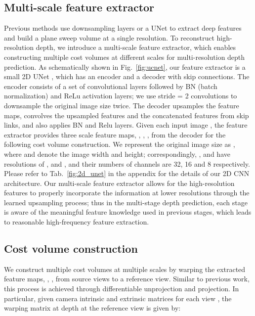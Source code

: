 \subsection{Multi-scale feature extractor}
\label{sec:feature}
Previous methods use downsampling layers \cite{yao2018mvsnet,yao2019recurrent} or a UNet \cite{xu2019deep} to extract deep features 
and build a plane sweep volume at a single resolution.
To reconstruct high-resolution depth, we introduce a multi-scale feature extractor, 
which enables constructing multiple cost volumes at different scales for multi-resolution depth prediction.
As schematically shown in Fig.~\ref{fig:ucnet}, 
our feature extractor is a small 2D UNet \cite{ronneberger2015u}, which has an encoder and a decoder with skip connections.
The encoder consists of a set of convolutional layers followed by BN (batch normalization) and ReLu activation layers; 
we use stride = 2 convolutions to downsample the original image size twice.
The decoder upsamples the feature maps, convolves the upsampled features and the concatenated features from skip links,
 and also applies BN and Relu layers.
Given each input image , the feature extractor provides three scale feature maps, , , , from the decoder for the following cost volume construction.
We represent the original image size as , where  and  denote the image width and height;
correspondingly, ,  and  have resolutions of ,  and , and their numbers of channels are 32, 16 and 8 respectively.
Please refer to Tab.~\ref{fig:2d_unet} in the appendix for the details of our 2D CNN architecture.
Our multi-scale feature extractor allows for the high-resolution features to properly incorporate the information at lower resolutions through the learned upsampling process;
thus in the multi-stage depth prediction, each stage is aware of the meaningful feature knowledge used in previous stages, 
which leads to reasonable high-frequency feature extraction.


\subsection{Cost volume construction}
\label{sec:volume}
We construct multiple cost volumes at multiple scales by warping the extracted feature maps, , ,  from source views to a reference view.
Similar to previous work, this process is achieved through differentiable unprojection and projection. 
In particular, given camera intrinsic and extrinsic matrices  for each view , 
the  warping matrix at depth  at the reference view is given by:

